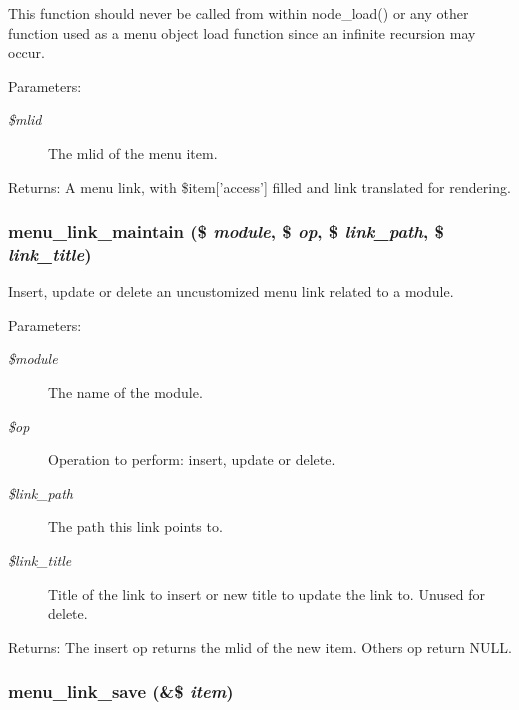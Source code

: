 This function should never be called from within node\_\-load() or any other function used as a menu object load function since an infinite recursion may occur.

\begin{Desc}
\item[Parameters:]
\begin{description}
\item[{\em \$mlid}]The mlid of the menu item. \end{description}
\end{Desc}
\begin{Desc}
\item[Returns:]A menu link, with \$item\mbox{[}'access'\mbox{]} filled and link translated for rendering. \end{Desc}
\hypertarget{group__menu_ge3248649fb437dedad940df74fb129dc}{
\subsubsection[{menu\_\-link\_\-maintain}]{\setlength{\rightskip}{0pt plus 5cm}menu\_\-link\_\-maintain (\$ {\em module}, \/  \$ {\em op}, \/  \$ {\em link\_\-path}, \/  \$ {\em link\_\-title})}}
\label{group__menu_ge3248649fb437dedad940df74fb129dc}


Insert, update or delete an uncustomized menu link related to a module.

\begin{Desc}
\item[Parameters:]
\begin{description}
\item[{\em \$module}]The name of the module. \item[{\em \$op}]Operation to perform: insert, update or delete. \item[{\em \$link\_\-path}]The path this link points to. \item[{\em \$link\_\-title}]Title of the link to insert or new title to update the link to. Unused for delete. \end{description}
\end{Desc}
\begin{Desc}
\item[Returns:]The insert op returns the mlid of the new item. Others op return NULL. \end{Desc}
\hypertarget{group__menu_g4fe84fbe31b5a3b6c7fa43e8fe912fb0}{
\subsubsection[{menu\_\-link\_\-save}]{\setlength{\rightskip}{0pt plus 5cm}menu\_\-link\_\-save (\&\$ {\em item})}}
\label{group__menu_g4fe84fbe31b5a3b6c7fa43e8fe912fb0}


